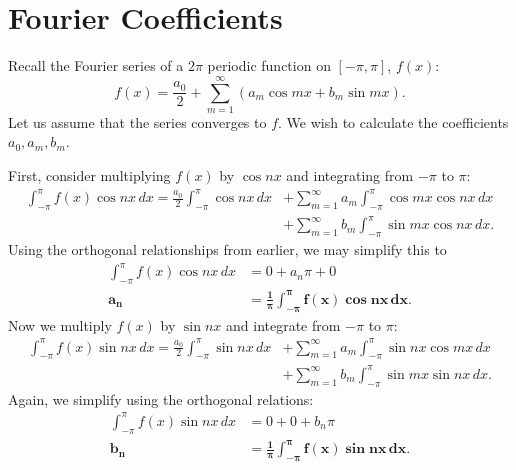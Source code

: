 \documentclass{amsart}
\begin{document}
  \section{Fourier Coefficients}

  Recall the Fourier series of a $2\pi$ periodic function on $[-\pi, \pi]$, $f(x)$:
  \begin{equation}
    f(x) = \frac{a_0}{2} + \sum_{m=1}^{\infty} (a_m \cos mx + b_m \sin mx).
  \end{equation}
  Let us assume that the series converges to $f$. We wish to calculate the coefficients $a_0, a_m, b_m$. 

  First, consider multiplying $f(x)$ by $\cos nx$ and integrating from $-\pi$ to $\pi$:
  \begin{align*}
    \int_{-\pi}^{\pi} f(x) \cos nx \, dx = \frac{a_0}{2} \int_{-\pi}^{\pi} \cos nx \, dx &+ \sum_{m=1}^{\infty} a_m \int_{-\pi}^{\pi}\cos mx \cos nx \, dx \\ &+ \sum_{m=1}^{\infty} b_m \int_{-\pi}^{\pi} \sin mx \cos nx \, dx .
  \end{align*}
  Using the orthogonal relationships from earlier, we may simplify this to 
  \begin{align*}
    \int_{-\pi}^{\pi} f(x) \cos nx \, dx &= 0 + a_n \pi + 0\\
    \bm{a_n} &\bm{= \frac{1}{\pi} \int_{-\pi}^{\pi} f(x) \cos nx \, dx} .
  \end{align*}
  Now we multiply $f(x)$ by $\sin nx$ and integrate from $-\pi$ to $\pi$:
  \begin{align*}
    \int_{-\pi}^{\pi} f(x) \sin nx \, dx = \frac{a_0}{2} \int_{-\pi}^{\pi} \sin nx \, dx &+ \sum_{m=1}^{\infty} a_m \int_{-\pi}^{\pi}\sin nx \cos mx \, dx \\ &+ \sum_{m=1}^{\infty} b_m \int_{-\pi}^{\pi} \sin mx \sin nx \, dx .
  \end{align*}
  Again, we simplify using the orthogonal relations:
  \begin{align*}
    \int_{-\pi}^{\pi} f(x) \sin nx\, dx &= 0 + 0 + b_n \pi \\
    \bm{b_n} &= \bm{\frac{1}{\pi} \int_{-\pi}^{\pi} f(x) \sin nx\, dx}. 
  \end{align*}
\end{document}
